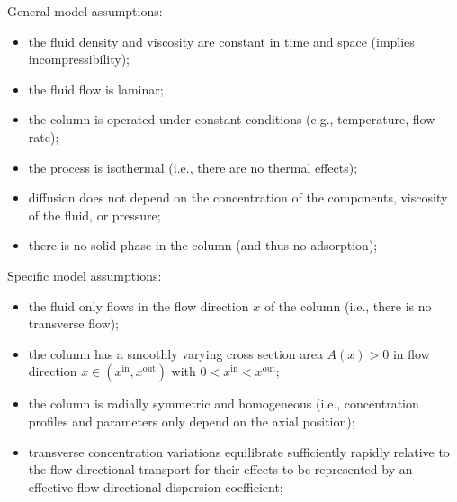\documentclass{article}
\begin{document}
General model assumptions:
\begin{itemize}
    \item the fluid density and viscosity are constant in time and space (implies incompressibility);
    \item the fluid flow is laminar;
    \item the column is operated under constant conditions (e.g., temperature, flow rate);
    \item the process is isothermal (i.e., there are no thermal effects);
    \item diffusion does not depend on the concentration of the components, viscosity of the fluid, or pressure;
    \item there is no solid phase in the column (and thus no adsorption);
\end{itemize}

Specific model assumptions:
\begin{itemize}
    \item the fluid only flows in the flow direction $x$ of the column (i.e., there is no transverse flow);
    \item the column has a smoothly varying cross section area $A(x) > 0$ in flow direction $x \in (x^{\mathrm{in}}, x^{\mathrm{out}})$ with $0 < x^{\mathrm{in}} < x^{\mathrm{out}}$;
    \item the column is radially symmetric and homogeneous (i.e., concentration profiles and parameters only depend on the axial position);
    \item transverse concentration variations equilibrate sufficiently rapidly relative to the flow-directional transport for their effects to be represented by an effective flow-directional dispersion coefficient;
\end{itemize}
\end{document}
